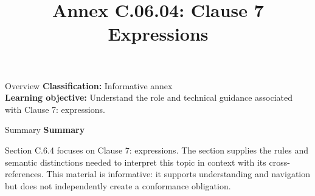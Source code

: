 \documentclass[10pt,letterpaper]{article}
\title{Annex C.06.04: Clause 7 Expressions}
\author{}
\date{}
\begin{document}
\maketitle
\begin{CornellOverviewBox}{Overview}
\textbf{Classification:} Informative annex\\[2pt]
\textbf{Learning objective:} Understand the role and technical guidance associated with Clause 7: expressions.
\end{CornellOverviewBox}\begin{CornellSummaryBox}{Summary}
{\sffamily\bfseries\color{Accent} Summary}\par\vspace{3pt}Section C.6.4 focuses on Clause 7: expressions. The section supplies the rules and semantic distinctions needed to interpret this topic in context with its cross-references. This material is informative: it supports understanding and navigation but does not independently create a conformance obligation.
\end{CornellSummaryBox}
\end{document}
